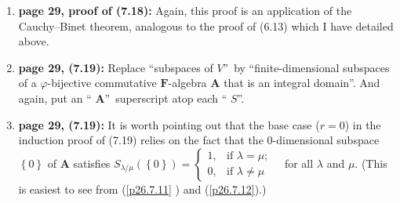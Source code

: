 \documentclass[numbers=enddot,12pt,final,onecolumn,notitlepage]{scrartcl}%
\theoremstyle{definition}
\begin{document}
\begin{enumerate}
Moreover, again, the claim should be generalized: We let $\mathbf{A}$ be a
commutative $F$-algebra that is $\varphi$-bijective and is an integral domain,
and we let $U$ and $V$ be two finite-dimensional $F$-vector subspaces of
$\mathbf{A}$ satisfying $U\subseteq V$. Then, the claim of (7.18) holds (once
the \textquotedblleft$S_{\lambda/\mu}\left(  U\right)  $\textquotedblright%
\ has been corrected to \textquotedblleft$S_{\lambda/\nu}\left(  U\right)
$\textquotedblright, and once each of the three \textquotedblleft%
$S$\textquotedblright s has received an \textquotedblleft$\mathbf{A}%
$\textquotedblright\ superscript atop of it\footnote{In other words,
\textquotedblleft$S_{\lambda/\mu}\left(  V\right)  $\textquotedblright,
\textquotedblleft$S_{\nu/\mu}\left(  V/U\right)  $\textquotedblright\ and
\textquotedblleft$S_{\lambda/\nu}\left(  U\right)  $\textquotedblright\ should
be read as \textquotedblleft$S_{\lambda/\mu}^{\mathbf{A}}\left(  V\right)
$\textquotedblright, \textquotedblleft$S_{\nu/\mu}^{\mathbf{A}}\left(
V/U\right)  $\textquotedblright\ and \textquotedblleft$S_{\lambda/\nu
}^{\mathbf{A}}\left(  U\right)  $\textquotedblright, respectively.}).

\item \textbf{page 29, proof of (7.18):} Again, this proof is an application
of the Cauchy--Binet theorem, analogous to the proof of (6.13) which I have
detailed above.

\item \textbf{page 29, (7.19):} Replace \textquotedblleft subspaces of
$V$\textquotedblright\ by \textquotedblleft finite-dimensional subspaces of a
$\varphi$-bijective commutative $\mathbf{F}$-algebra $\mathbf{A}$ that is an
integral domain\textquotedblright. And again, put an \textquotedblleft%
$\mathbf{A}$\textquotedblright\ superscript atop each \textquotedblleft%
$S$\textquotedblright.

\item \textbf{page 29, (7.19):} It is worth pointing out that the base case
($r=0$) in the induction proof of (7.19) relies on the fact that the
$0$-dimensional subspace $\left\{  0\right\}  $ of $\mathbf{A}$ satisfies
$S_{\lambda/\mu}\left(  \left\{  0\right\}  \right)  =%
\begin{cases}
1, & \text{if }\lambda=\mu;\\
0, & \text{if }\lambda\neq\mu
\end{cases}
$\ \ for all $\lambda$ and $\mu$. (This is easiest to see from (\ref{p26.7.11}%
) and (\ref{p26.7.12}).)


\end{enumerate}
\end{document}
